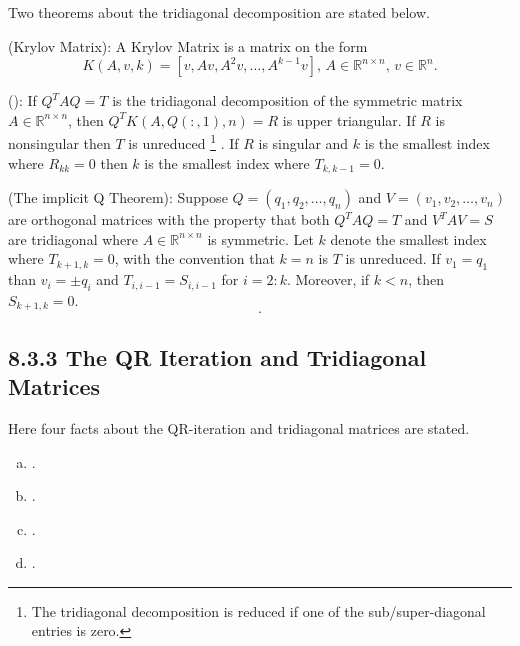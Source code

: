 Two theorems about the tridiagonal decomposition are stated below.
\begin{definition}(Krylov Matrix):
A Krylov Matrix is a matrix on the form
\begin{equation}
	K(A,v,k) = [v, Av, A^2v,\dots,A^{k-1}v],\, A\in\mathbb R^{n\times n},\,v\in\mathbb R^n.
\end{equation}
\end{definition}
%
\begin{theorem}():
If $Q^TAQ=T$ is the tridiagonal decomposition of the symmetric matrix $A\in \mathbb R^{n\times n}$,
then $Q^TK(A, Q(:,1),n) =R$ is upper triangular.
%
If $R$ is nonsingular then $T$ is unreduced
\footnote{The tridiagonal decomposition is reduced if one of the sub/super-diagonal entries is zero.}
. If $R$ is singular and $k$ is the smallest index 
where $R_{kk}=0$ then $k$ is the smallest index where $T_{k,k-1}=0$. 
\end{theorem}
%
\begin{theorem}(The implicit Q Theorem):
Suppose $Q=(q_1,q_2,\dots,q_n)$ and $V=(v_1,v_2,\dots,v_n)$ are orthogonal matrices with the property
that both $Q^TAQ=T$ and $V^TAV=S$ are tridiagonal where $A\in\mathbb R^{n\times n}$ is symmetric.
Let $k$ denote the smallest index where $T_{k+1,k}=0$, with the convention that $k=n$ is $T$ is 
unreduced. If $v_1=q_1$ than $v_i=\pm q_i$ and $T_{i,i-1} = S_{i,i-1}$ for $i=2:k$. Moreover, if
$k<n$, then $S_{k+1,k}=0$.
\begin{equation}
.
\end{equation}
\end{theorem}


\subsection*{8.3.3 The QR Iteration and Tridiagonal Matrices}%

Here four facts about the QR-iteration and tridiagonal matrices are stated.
%
\begin{enumerate}[(a):]
\item .
\item .
\item .
\item .
\end{enumerate}


